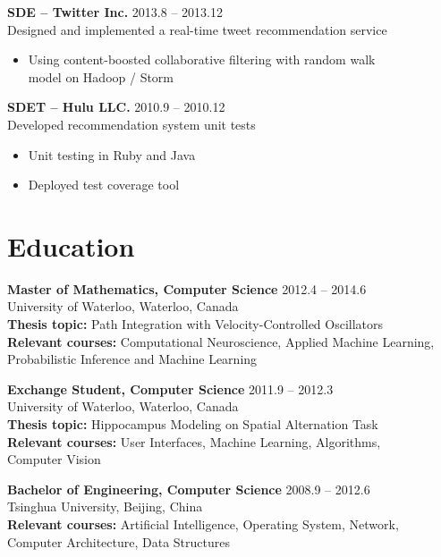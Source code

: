 \documentclass[margin]{res}
\begin{document}
\begin{resume}
{\bf SDE -- Twitter Inc.} \hfill 2013.8 -- 2013.12\\
Designed and implemented a real-time tweet recommendation service
\begin{itemize} \itemsep -2pt
\item Using content-boosted collaborative filtering with random walk\\ model on Hadoop / Storm
\end{itemize}

{\bf SDET -- Hulu LLC.} \hfill 2010.9 -- 2010.12\\
Developed recommendation system unit tests
\begin{itemize} \itemsep -2pt
\item Unit testing in Ruby and Java
\item Deployed test coverage tool
\end{itemize} 

\section{Education}

 {\bf Master of Mathematics, Computer Science} \hfill 2012.4 -- 2014.6\\
 University of Waterloo, Waterloo, Canada\\
 {\bf Thesis topic:} Path Integration with Velocity-Controlled Oscillators\\
 {\bf Relevant courses:} Computational Neuroscience,  Applied Machine Learning,\\
 Probabilistic Inference and Machine Learning
 
 {\bf Exchange Student, Computer Science} \hfill 2011.9 -- 2012.3\\
 University of Waterloo, Waterloo, Canada\\
 {\bf Thesis topic:} Hippocampus Modeling on Spatial Alternation Task\\
 {\bf Relevant courses:} User Interfaces, Machine Learning, Algorithms, \\
 Computer Vision
 
 {\bf Bachelor of Engineering, Computer Science} \hfill 2008.9 -- 2012.6\\
 Tsinghua University, Beijing, China\\
 {\bf Relevant courses:} Artificial Intelligence, Operating System, Network, \\
 Computer Architecture, Data Structures




\end{resume}
\end{document}
